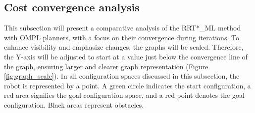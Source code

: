 \documentclass{ctuthesis}
\begin{document}
\subsection{Cost convergence analysis}
This subsection will present a comparative analysis of the RRT*\_ML method with OMPL planners, 
with a focus on their convergence during iterations.
To enhance visibility and emphasize changes, the graphs will be scaled. 
Therefore, the Y-axis will be adjusted to start 
at a value just below the convergence line of the graph, 
ensuring larger and clearer graph representation (Figure \ref{fig:graph_scale}).
In all configuration spaces discussed in this subsection, 
the robot is represented by a point. 
A green circle indicates the start configuration, 
a red area signifies the goal configuration space, 
and a red point denotes the goal configuration. 
Black areas represent obstacles.
\end{document}
